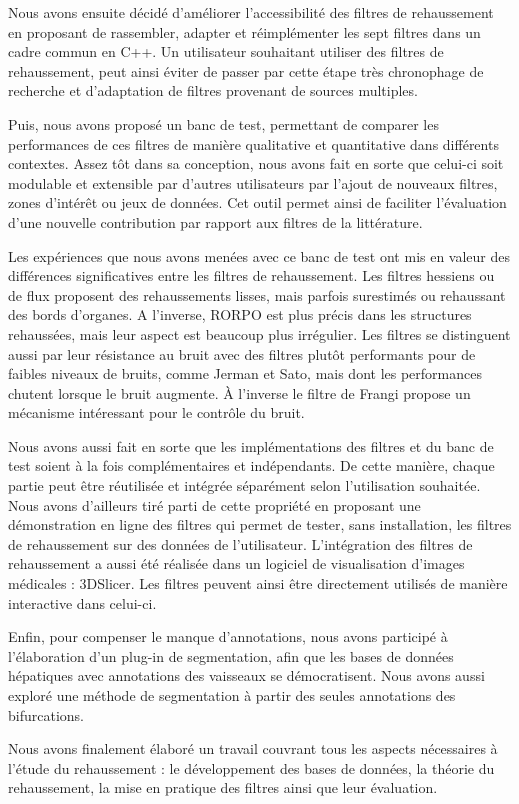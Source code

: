 Nous avons ensuite décidé d'améliorer l'accessibilité des filtres de rehaussement en proposant de rassembler, adapter et réimplémenter les sept filtres dans un cadre commun en C++. Un utilisateur souhaitant utiliser des filtres de rehaussement, peut ainsi éviter de passer par cette étape très chronophage de recherche et d'adaptation de filtres provenant de sources multiples. 

Puis, nous avons proposé un banc de test, permettant de comparer les performances de ces filtres de manière qualitative et quantitative dans différents contextes. Assez tôt dans sa conception, nous avons fait en sorte que celui-ci soit modulable et extensible par d'autres utilisateurs par l'ajout de nouveaux filtres, zones d'intérêt ou jeux de données. Cet outil permet ainsi de faciliter l'évaluation d'une nouvelle contribution par rapport aux filtres de la littérature.

Les expériences que nous avons menées avec ce banc de test ont mis en valeur des différences significatives entre les filtres de rehaussement. Les filtres hessiens ou de flux proposent des rehaussements lisses, mais parfois surestimés ou rehaussant des bords d'organes. A l'inverse, RORPO est plus précis dans les structures rehaussées, mais leur aspect est beaucoup plus irrégulier. Les filtres se distinguent aussi par leur résistance au bruit avec des filtres plutôt performants pour de faibles niveaux de bruits, comme Jerman et Sato, mais dont les performances chutent lorsque le bruit augmente. À l'inverse le filtre de Frangi propose un mécanisme intéressant pour le contrôle du bruit.

Nous avons aussi fait en sorte que les implémentations des filtres et du banc de test soient à la fois complémentaires et indépendants. De cette manière, chaque partie peut être réutilisée et intégrée séparément selon l'utilisation souhaitée. Nous avons d'ailleurs tiré parti de cette propriété en proposant une démonstration en ligne des filtres qui permet de tester, sans installation, les filtres de rehaussement sur des données de l'utilisateur. L'intégration des filtres de rehaussement a aussi été réalisée dans un logiciel de visualisation d'images médicales : 3DSlicer. Les filtres peuvent ainsi être directement utilisés de manière interactive dans celui-ci.

Enfin, pour compenser le manque d'annotations, nous avons participé à l'élaboration d'un plug-in de segmentation, afin que les bases de données hépatiques avec annotations des vaisseaux se démocratisent. Nous avons aussi exploré une méthode de segmentation à partir des seules annotations des bifurcations.

Nous avons finalement élaboré un travail couvrant tous les aspects nécessaires à l'étude du rehaussement : le développement des bases de données, la théorie du rehaussement, la mise en pratique des filtres ainsi que leur évaluation.